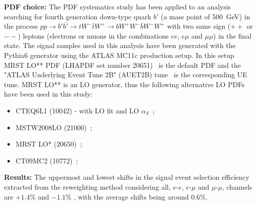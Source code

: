 \vspace{0.4cm}
\noindent
{\bf PDF choice:}
The PDF systematics study has been applied to an analysis searching for fourth generation down-type 
quark $b'$ (a mass point of 500~GeV) in the process 
$pp \rightarrow b'\bar{b'}\rightarrow tW^-\bar{t}W^+ \rightarrow bW^+W^-\bar{b}W^-W^+$ with two same 
sign ($+ +$ or $- -$) leptons (electrons or muons in the combinations $e e$, $e \mu$ and $\mu \mu$) 
in the final state. The signal samples used in this analysis have been generated with the Pythia6 
generator using the ATLAS MC11c production setup. In this setup MRST LO** PDF (LHAPDF set number 
20651)~\cite{LOstar,LOstarstar} is the default PDF and the "ATLAS Underlying Event Tune 2B" (AUET2B)
tune~\cite{AUET2B} is the corresponding UE tune. MRST LO** is an LO generator, thus the following 
alternative LO PDFs have been used in this study:
\begin{itemize}
%
\item CTEQ6L1 (10042) - with LO fit and LO $\alpha_S$~\cite{CTEQ6};
%
\item MSTW2008LO (21000)~\cite{MSTW2008LO};
%
\item MRST LO* (20650)~\cite{MRSTLOX};
%
\item CT09MC2 (10772)~\cite{CT09MC2};
%
\end{itemize}


\vspace{0.4cm}
\noindent
{\bf Results:}
The uppermost and lowest shifts in the signal event selection efficiency extracted from the reweighting method
considering all, $e$-$e$, $e$-$\mu$ and $\mu$-$\mu$, channels are $+1.4$\% and $-1.1$\% , with the average 
shifts being around 0.6\%.



 

